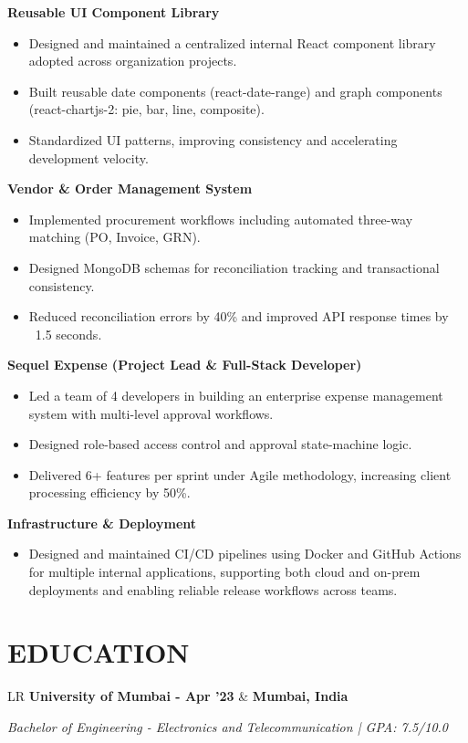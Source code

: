 \documentclass[10pt,a4paper]{moderncv}
\newcommand*{\educationentry}[3]{
    \begin{tabularx}{\textwidth}{LR}
        {\bfseries #1} & {\bfseries #2} \\
    \end{tabularx}
    {\itshape #3}
}
\begin{document}
\textbf{Reusable UI Component Library}
\begin{itemize}
    \item Designed and maintained a centralized internal React component library adopted across organization projects.
    \item Built reusable date components (react-date-range) and graph components (react-chartjs-2: pie, bar, line, composite).
    \item Standardized UI patterns, improving consistency and accelerating development velocity.
\end{itemize}

\textbf{Vendor \& Order Management System}
\begin{itemize}
    \item Implemented procurement workflows including automated three-way matching (PO, Invoice, GRN).
    \item Designed MongoDB schemas for reconciliation tracking and transactional consistency.
    \item Reduced reconciliation errors by 40\% and improved API response times by ~1.5 seconds.
\end{itemize}

\textbf{Sequel Expense (Project Lead \& Full-Stack Developer)}
\begin{itemize}
    \item Led a team of 4 developers in building an enterprise expense management system with multi-level approval workflows.
    \item Designed role-based access control and approval state-machine logic.
    \item Delivered 6+ features per sprint under Agile methodology, increasing client processing efficiency by 50\%.
\end{itemize}

\textbf{Infrastructure \& Deployment}
\begin{itemize}
    \item Designed and maintained CI/CD pipelines using Docker and GitHub Actions for multiple internal applications, supporting both cloud and on-prem deployments and enabling reliable release workflows across teams.
\end{itemize}

\section{EDUCATION}

\educationentry
{University of Mumbai - Apr '23}
{Mumbai, India}
{Bachelor of Engineering - Electronics and Telecommunication \quad | \quad GPA: 7.5/10.0}
\end{document}
